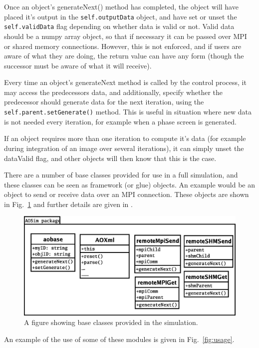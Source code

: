 \documentclass{article}
\begin{document}
Once an object's generateNext() method has completed, the object will
have placed it's output in the \texttt{self.outputData} object, and
have set or unset the \texttt{self.validData} flag depending on
whether data is valid or not.  Valid data should be a numpy array
object, so that if necessary it can be passed over MPI or shared
memory connections.  However, this is not enforced, and if users are
aware of what they are doing, the return value can have any form
(though the successor must be aware of what it will receive).

Every time an object's generateNext method is called by the control
process, it may access the predecessors data, and additionally,
specify whether the predecessor should generate data for the next
iteration, using the \texttt{self.parent.setGenerate()} method.  This
is useful in situation where new data is not needed every iteration,
for example when a phase screen is generated.

If an object requires more than one iteration to compute it's data
(for example during integration of an image over several iterations),
it can simply unset the dataValid flag, and other objects will then
know that this is the case.

There are a number of base classes provided for use in a full
simulation, and these classes can be seen as framework (or glue)
objects.  An example would be an object to send or receive data over
an MPI connection.  These objects are shown in
Fig.~\ref{fig:baseclass} and further details are given in \citet{apidoc}.

\begin{figure}
\includegraphics[width=15cm]{pics/baseClasses.eps}
\caption{A figure showing base classes provided in the simulation.}
\label{fig:baseclass}
\end{figure}

An example of the use of some of these modules is given in
Fig.~\ref{fig:usage}.  
\end{document}
